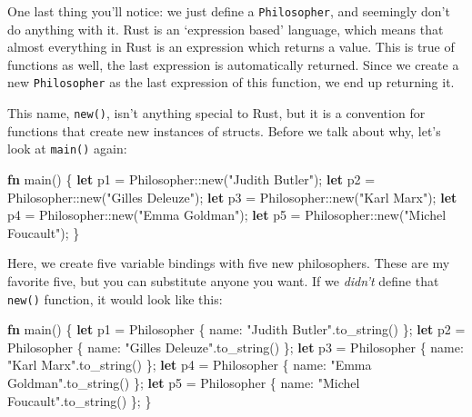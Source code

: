 \documentclass[a4paper,]{book}
\newenvironment{Shaded}{\begin{snugshade}}{\end{snugshade}}
\newcommand{\KeywordTok}[1]{\textcolor[rgb]{0.13,0.29,0.53}{\textbf{{#1}}}}
\newcommand{\StringTok}[1]{\textcolor[rgb]{0.31,0.60,0.02}{{#1}}}
\newcommand{\NormalTok}[1]{{#1}}
\begin{document}
One last thing you'll notice: we just define a \texttt{Philosopher}, and
seemingly don't do anything with it. Rust is an `expression based'
language, which means that almost everything in Rust is an expression
which returns a value. This is true of functions as well, the last
expression is automatically returned. Since we create a new
\texttt{Philosopher} as the last expression of this function, we end up
returning it.

This name, \texttt{new()}, isn't anything special to Rust, but it is a
convention for functions that create new instances of structs. Before we
talk about why, let's look at \texttt{main()} again:

\begin{Shaded}
\begin{Highlighting}[]
\KeywordTok{fn} \NormalTok{main() \{}
    \KeywordTok{let} \NormalTok{p1 = Philosopher::new(}\StringTok{"Judith Butler"}\NormalTok{);}
    \KeywordTok{let} \NormalTok{p2 = Philosopher::new(}\StringTok{"Gilles Deleuze"}\NormalTok{);}
    \KeywordTok{let} \NormalTok{p3 = Philosopher::new(}\StringTok{"Karl Marx"}\NormalTok{);}
    \KeywordTok{let} \NormalTok{p4 = Philosopher::new(}\StringTok{"Emma Goldman"}\NormalTok{);}
    \KeywordTok{let} \NormalTok{p5 = Philosopher::new(}\StringTok{"Michel Foucault"}\NormalTok{);}
\NormalTok{\}}
\end{Highlighting}
\end{Shaded}

Here, we create five variable bindings with five new philosophers. These
are my favorite five, but you can substitute anyone you want. If we
\emph{didn't} define that \texttt{new()} function, it would look like
this:

\begin{Shaded}
\begin{Highlighting}[]
\KeywordTok{fn} \NormalTok{main() \{}
    \KeywordTok{let} \NormalTok{p1 = Philosopher \{ name: }\StringTok{"Judith Butler"}\NormalTok{.to_string() \};}
    \KeywordTok{let} \NormalTok{p2 = Philosopher \{ name: }\StringTok{"Gilles Deleuze"}\NormalTok{.to_string() \};}
    \KeywordTok{let} \NormalTok{p3 = Philosopher \{ name: }\StringTok{"Karl Marx"}\NormalTok{.to_string() \};}
    \KeywordTok{let} \NormalTok{p4 = Philosopher \{ name: }\StringTok{"Emma Goldman"}\NormalTok{.to_string() \};}
    \KeywordTok{let} \NormalTok{p5 = Philosopher \{ name: }\StringTok{"Michel Foucault"}\NormalTok{.to_string() \};}
\NormalTok{\}}
\end{Highlighting}
\end{Shaded}
\end{document}
